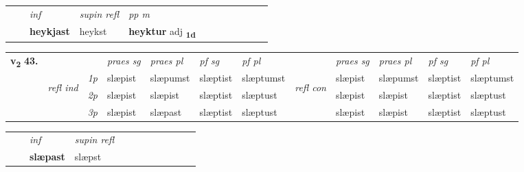 \begin{tabular}{llllllllllll}
 & & \textit{inf}       & \textit{supin refl} & \textit{pp m}     \\*
  & & \textbf{heykjast}        & heykst & \textbf{heyktur} adj \textbf{\textsubscript{1d}} \\*
\cmidrule{1-12}
\end{tabular}



\begin{tabular}{llllllllllll} \toprule
\multirow{4}{*}{{{\textbf{v{\textsubscript{2}}} \Large{\textbf{43.}}}}}  & &   &  \textit{praes sg}  & \textit{praes pl}  &\textit{pf sg} & \textit{pf pl} &  &  \textit{praes sg}  & \textit{praes pl}  & \textit{pf sg} & \textit{pf pl } \\*
	\cmidrule{4-7} \cmidrule{9-12}
 &\multirow{3}{*}{\begin{turn}{90}\textit{refl ind}\end{turn}} & {\textit{1p}} & slæpist & slæpumst    & slæptist & slæptumst & \multirow{3}{*}{\begin{turn}{90}\textit{refl con}\end{turn}}  &slæpist & slæpumst & slæptist & slæptumst\\*
 &&  {\textit{2p}} &  slæpist  & slæpist   & slæptist & slæptust & &slæpist & slæpist & slæptist & slæptust \\*
& &  {\textit{3p}} & slæpist & slæpast   & slæptist & slæptust & & slæpist & slæpist& slæptist & slæptust  \\*
\cmidrule{4-7} \cmidrule{9-12}
\end{tabular}


\begin{tabular}{llllllllllll}
 & & \textit{inf}       & \textit{supin refl}      \\*
  & & \textbf{slæpast}        & slæpst  \\*
\cmidrule{1-12}
\end{tabular}



